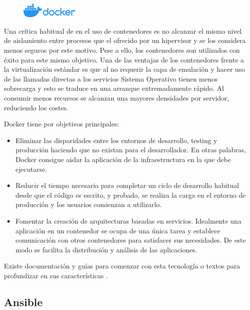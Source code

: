 \begin{figure}
    \centering
    \includegraphics[width=0.25\textwidth]{imaxes/e-fundamentos-tecnologicos/logo-docker.png}
\end{figure}

Una crítica habitual de en el uso de contenedores es no alcanzar el mismo nivel de aislamiento entre procesos que el ofrecido por un hipervisor y se los considera menos seguros por este motivo. Pese a ello, los contenedores son utilizados con éxito para este mismo objetivo. Una de las ventajas de los contenedores frente a la virtualización estándar es que al no requerir la capa de emulación y hacer uso de las llamadas directas a los servicios Sistema Operativo tienen menos sobrecarga y esto se traduce en una arranque extremadamente rápido. Al consumir menos recursos se alcanzan una mayores densidades por servidor, reduciendo los costes.

Docker tiene por objetivos principales:
\begin{itemize}
    \item Eliminar las disparidades entre los entornos de desarrollo, testing y producción haciendo que no existan para el desarrollador. En otras palabras, Docker consigue aislar la aplicación de la infraestructura en la que debe ejecutarse.
    \item Reducir el tiempo necesario para completar un ciclo de desarrollo habitual desde que el código es escrito, y probado, se realiza la carga en el entorno de producción y los usuarios comienzan a utilizarlo.
    \item Fomentar la creación de arquitecturas basadas en servicios. Idealmente una aplicación en un contenedor se ocupa de una única tarea y establece comunicación con otros contenedores para satisfacer sus necesidades. De este modo se facilita la distribución y análisis de las aplicaciones.
\end{itemize}

Existe documentación y guías para comenzar con esta tecnología \cite{dockerInc_web_startGuides} o textos para profundizar en sus características \cite{turnbull_book_dockerBook}.


\subsection{Ansible}

